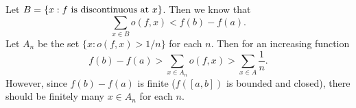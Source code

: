 
\begin{solution}
    Let $B=\{x:\textnormal
    {$f$ is discontinuous at $x$}\}$. Then
    we know that
    $$\sum_{x\in B}{o(f,x)}<f(b)-f(a).$$
    Let $A_n$ be the set $\{x:o(f,x)>1/n\}$
    for each $n$.
    Then for an increasing function
    $$f(b)-f(a)>\sum_{x\in A_n}{o(f,x)}
    >\sum_{x\in A}{\dfrac{1}{n}}.$$
    However, since $f(b)-f(a)$ is finite
    ($f([a,b])$ is bounded and
    closed),
    there should be finitely many
    $x\in A_n$ for each $n$.

\end{solution}